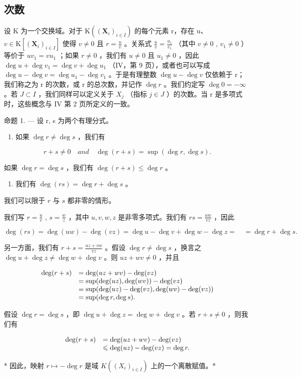 \subsection{次数}

设 K 为一个交换域。对于 \(\mathrm{K}((\mathbf{X}_{i})_{i\in I})\) 的每个元素 r，存在 u、 \(v\in\mathrm{K}[(\mathbf{X}_{i})_{i\in I}]\) 使得 \(v\neq0\) 且 \(r=\frac{u}{v}\) 。关系式 \(\frac{u}{v}=\frac{u_{1}}{v_{1}}\) （其中 \(v\neq0\) , \(v_{1}\neq0\) ）等价于 \(uv_{1}=vu_{1}\) ；如果 \(r\neq0\) ，我们有 \(u\neq0\) 且 \(u_{1}\neq0\) ，因此 \(\deg u+\deg v_{1}=\deg v+\deg u_{1}\) （IV，第 9 页），或者也可以写成 \(\deg u-\deg v=\deg u_{1}-\deg v_{1}\) 。于是有理整数 \(\deg u-\deg v\) 仅依赖于 r；我们称之为 r 的次数，或 r 的总次数，并记作 \(\deg r\) 。我们约定写 \(\deg0=-\infty\) 。若 \(J\subset I\) ，我们同样可以定义关于 \(X_{j}\) （指标 \(j\in J\) ）的次数。当 r 是多项式时，这些概念与 IV 第 2 页所定义的一致。

命题 1. --- 设 r, s 为两个有理分式。

\begin{enumerate}
\def\labelenumi{(\roman{enumi})}
\tightlist
\item
  如果 \(\deg r \neq \deg s\) ，我们有
\end{enumerate}

\[
r + s \neq 0 \quad a n d \quad \deg (r + s) = \sup (\deg r, \deg s).
\]

如果 \(\deg r = \deg s\) ，我们有 \(\deg (r + s) \leqslant \deg r\) 。

\begin{enumerate}
\def\labelenumi{(\roman{enumi})}
\setcounter{enumi}{1}
\tightlist
\item
  我们有 \(\deg(rs) = \deg r + \deg s\) 。
\end{enumerate}

我们可以限于 \(r\) 与 \(s\) 都非零的情形。

我们写 \(r = \frac{u}{v}\) , \(s = \frac{w}{z}\) ，其中 \(u, v, w, z\) 是非零多项式。我们有 \(rs = \frac{uw}{vz}\) ，因此

\[
\deg (r s) = \deg (u w) - \deg (v z) = \deg u - \deg v + \deg w - \deg z = \quad = \deg r + \deg s.
\]

另一方面，我们有 \(r + s = \frac{uz + vw}{vz}\) 。假设 \(\deg r \neq \deg s\) ，换言之 \(\deg u + \deg z \neq \deg w + \deg v\) 。则 \(uz + wv \neq 0\) ，并且

\[
\begin{array}{r l} \deg (r + s) & = \deg (u z + w v) - \deg (v z) \\ & = \sup (\deg (u z), \deg (w v)) - \deg (v z) \\ & = \sup (\deg (u z) - \deg (v z), \deg (w v) - \deg (v z)) \\ & = \sup (\deg r, \deg s). \end{array}
\]

假设 \(\deg r = \deg s\) ，即 \(\deg u + \deg z = \deg w + \deg v\) 。若 \(r + s \neq 0\) ，则我们有

\[
\begin{array}{r l} \deg (r + s) & = \deg (u z + w v) - \deg (v z) \\ & \leqslant \deg (u z) - \deg (v z) = \deg r. \end{array}
\]

* 因此，映射 \(r \mapsto -\deg r\) 是域 \(K((X_i)_{i \in I})\) 上的一个离散赋值。*

